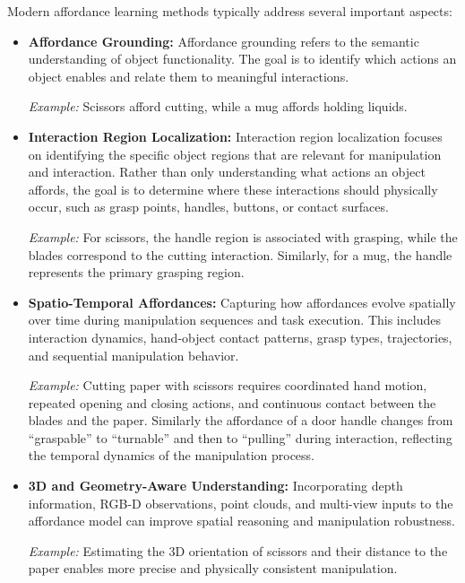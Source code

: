   

    Modern affordance learning methods typically address several important aspects:

\begin{itemize}
    \item \textbf{Affordance Grounding:} 
    Affordance grounding refers to the semantic understanding of object functionality. The goal is to identify which actions an object enables and relate them to meaningful interactions.

    \textit{Example:} Scissors afford cutting, while a mug affords holding liquids.

    \item \textbf{Interaction Region Localization:} Interaction region localization focuses on identifying the specific object regions that are relevant for manipulation and interaction. Rather than only understanding what actions an object affords, the goal is to determine where these interactions should physically occur, such as grasp points, handles, buttons, or contact surfaces.
    
    \textit{Example:} For scissors, the handle region is associated with grasping, while the blades correspond to the cutting interaction. Similarly, for a mug, the handle represents the primary grasping region.

    \item \textbf{Spatio-Temporal Affordances:} 
    Capturing how affordances evolve spatially over time during manipulation sequences and task execution. 
    This includes interaction dynamics, hand-object contact patterns, grasp types, trajectories, and sequential manipulation behavior.

    \textit{Example:} Cutting paper with scissors requires coordinated hand motion, repeated opening and closing actions, and continuous contact between the blades and the paper. 
    Similarly the affordance of a door handle changes from ``graspable'' to ``turnable'' and then to ``pulling'' during interaction, reflecting the temporal dynamics of the manipulation process.

    \item \textbf{3D and Geometry-Aware Understanding:} 
    Incorporating depth information, RGB-D observations, point clouds, and multi-view inputs to the affordance model can improve spatial reasoning and manipulation robustness.

    \textit{Example:} Estimating the 3D orientation of scissors and their distance to the paper enables more precise and physically consistent manipulation.
\end{itemize}








